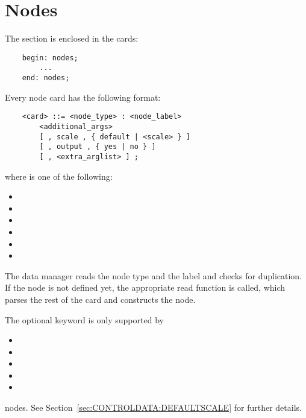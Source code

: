 %
%
%
%
%
% 
%
%

\chapter{Nodes}\label{sec:NODES}
The  section is enclosed in the cards:
\begin{verbatim}
    begin: nodes;
        ...
    end: nodes;
\end{verbatim}
Every node card has the following format:
\begin{verbatim}
    <card> ::= <node_type> : <node_label>
        <additional_args>
        [ , scale , { default | <scale> } ]
        [ , output , { yes | no } ]
        [ , <extra_arglist> ] ;
\end{verbatim}
where  is one of the following:
\begin{itemize}
    \item {}
    \item {}
    \item {}
    \item {}
    \item {}
    \item {}
\end{itemize}
The data manager reads the node type and the label and checks for
duplication.
If the node is not defined yet, the appropriate read function is
called, which parses the rest of the card and constructs the node.

The optional  keyword is only supported by
\begin{itemize}
    \item {}
    \item {}
    \item {}
    \item {}
    \item {}
\end{itemize}
nodes.
See Section~\ref{sec:CONTROLDATA:DEFAULTSCALE} for further details.




